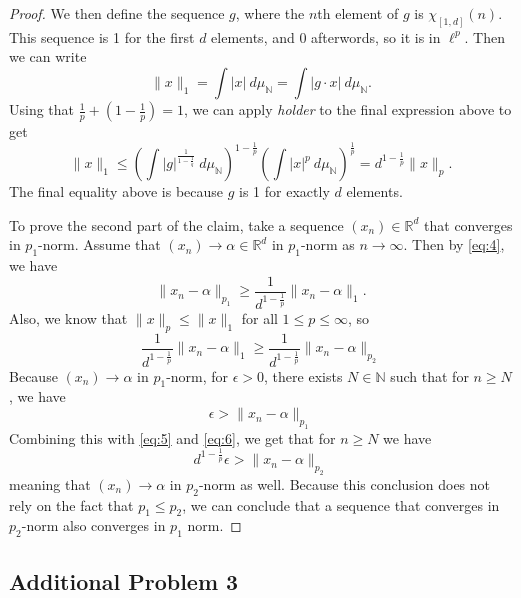 \documentclass[12pt]{article}
\newcommand{\R}{\mathbb{R}}
\newcommand{\N}{\mathbb{N}}
\newcommand{\eq}[1]{\begin{equation*}#1\end{equation*}}
\newcommand{\qeq}[1]{\begin{equation}#1\end{equation}}
\begin{document}
\begin{itemize}
\begin{proof}
        We then define the sequence $g$, where the $n$th element of $g$ is $\chi_{[1, d]}(n)$. This sequence is 1 for the first $d$ elements, and 0 afterwords, so it is in $\ell^p$. Then we can write
        \eq{\|x\|_1 = \int |x| ~d \mu_\N = \int |g \cdot x| ~d \mu_\N.}
        Using that $\frac{1}{p} +(1 - \frac{1}{p}) = 1$, we can apply \textit{holder} to the final expression above to get
        \eq{\|x\|_1 \leq \left( \int |g|^\frac{1}{1- \frac{1}{q}} ~d \mu_\N \right)^{1-\frac{1}{p}} \left( \int |x|^p ~d \mu_\N\right)^\frac{1}{p} = d^{1-\frac{1}{p}} \|x\|_p.}
        The final equality above is because $g$ is 1 for exactly $d$ elements.

        To prove the second part of the claim, take a sequence $(x_n) \in \R^d$ that converges in $p_1$-norm. Assume that $(x_n) \to \alpha \in \R^d$ in $p_1$-norm as $n \to \infty$. Then by \eqref{eq:4}, we have
        \qeq{\|x_n - \alpha\|_{p_1} \geq \frac{1}{d^{1-\frac{1}{p}}} \|x_n - \alpha\|_1. \label{eq:5}} Also, we know that $\|x\|_p \leq \|x\|_1$ for all $1 \leq p \leq \infty$, so 
        \qeq{\frac{1}{d^{1-\frac{1}{p}}} \|x_n - \alpha\|_1 \geq \frac{1}{d^{1-\frac{1}{p}}} \|x_n - \alpha \|_{p_2} \label{eq:6}}
        Because $(x_n) \to \alpha$ in $p_1$-norm, for $\epsilon > 0$, there exists $N \in \N$ such that for $n \geq N$, we have
        \eq{\epsilon > \|x_n - \alpha\|_{p_1}}
        Combining this with \eqref{eq:5} and \eqref{eq:6}, we get that for $n \geq N$ we have
        \eq{d^{1-\frac{1}{p}} \epsilon > \|x_n - \alpha\|_{p_2}}
        meaning that $(x_n) \to \alpha$ in $p_2$-norm as well. Because this conclusion does not rely on the fact that $p_1 \leq p_2$, we can conclude that a sequence that converges in $p_2$-norm also converges in $p_1$ norm.
    \end{proof} 
\end{itemize}

\subsection*{Additional Problem 3}
\end{document}
